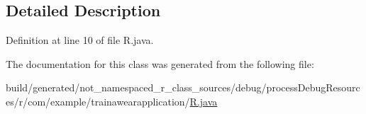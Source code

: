 \subsection{Detailed Description}


Definition at line 10 of file R.\+java.



The documentation for this class was generated from the following file\+:\begin{DoxyCompactItemize}
\item 
build/generated/not\+\_\+namespaced\+\_\+r\+\_\+class\+\_\+sources/debug/process\+Debug\+Resources/r/com/example/trainawearapplication/\mbox{\hyperlink{com_2example_2trainawearapplication_2_r_8java}{R.\+java}}\end{DoxyCompactItemize}
